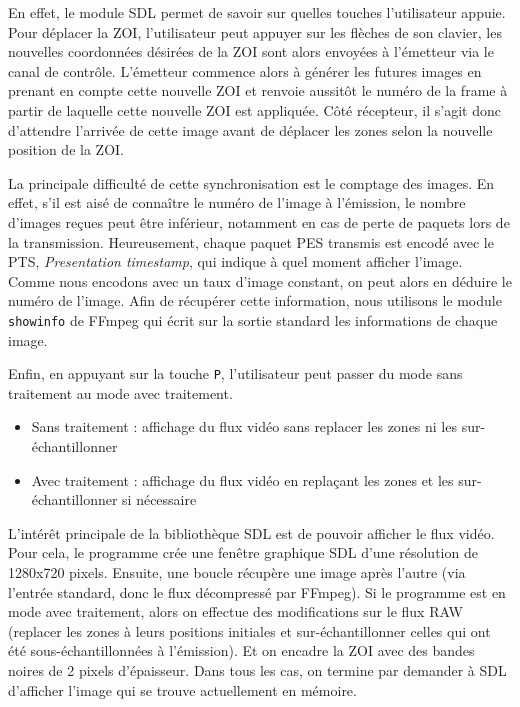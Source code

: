 \documentclass[11pt,a4paper]{article}
\begin{document}
\bigbreak
En effet, le module SDL permet de savoir sur quelles touches l'utilisateur appuie. 
Pour déplacer la ZOI, l'utilisateur peut appuyer sur les flèches de son clavier, les nouvelles coordonnées désirées de la ZOI sont alors envoyées à l'émetteur via le canal de contrôle.
L'émetteur commence alors à générer les futures images en prenant en compte cette nouvelle ZOI et renvoie aussitôt le numéro de la frame à partir de laquelle cette nouvelle ZOI est appliquée.
Côté récepteur, il s'agit donc d'attendre l'arrivée de cette image avant de déplacer les zones selon la nouvelle position de la ZOI.

La principale difficulté de cette synchronisation est le comptage des images. En effet, s'il est aisé de connaître le numéro de l'image à l'émission, le nombre d'images reçues peut être inférieur, notamment en cas de perte de paquets lors de la transmission.
Heureusement, chaque paquet PES transmis est encodé avec le PTS, \textit{Presentation timestamp}, qui indique à quel moment afficher l'image.
Comme nous encodons avec un taux d'image constant, on peut alors en déduire le numéro de l'image.
Afin de récupérer cette information, nous utilisons le module \texttt{showinfo} de FFmpeg qui écrit sur la sortie standard les informations de chaque image.

\bigbreak
Enfin, en appuyant sur la touche \texttt{P}, l'utilisateur peut passer du mode sans traitement au mode avec traitement.

\bigbreak
\begin{itemize}
\item{Sans traitement : affichage du flux vidéo sans replacer les zones ni les sur-échantillonner}
\item{Avec traitement : affichage du flux vidéo en replaçant les zones et les sur-échantillonner si nécessaire}
\end{itemize}

\bigbreak
L'intérêt principale de la bibliothèque SDL est de pouvoir afficher le flux vidéo.
Pour cela, le programme crée une fenêtre graphique SDL d'une résolution de 1280x720 pixels.
Ensuite, une boucle récupère une image après l'autre (via l'entrée standard, donc le flux décompressé par FFmpeg).
Si le programme est en mode avec traitement, alors on effectue des modifications sur le flux RAW (replacer les zones à leurs positions initiales et sur-échantillonner celles qui ont été sous-échantillonnées à l'émission). 
Et on encadre la ZOI avec des bandes noires de 2 pixels d'épaisseur.
Dans tous les cas, on termine par demander à SDL d'afficher l'image qui se trouve actuellement en mémoire.
\end{document}
